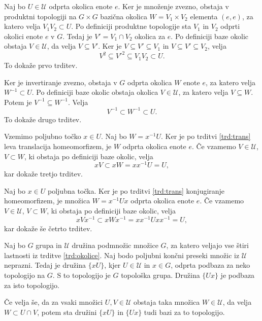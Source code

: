 \documentclass[mat1]{fmfdelo}
\newcommand{\Ucurl}{\mathcal{U}}
\begin{document}
\begin{dokaz}
Naj bo $U \in \Ucurl$  odprta okolica enote $e$. Ker je množenje zvezno, obstaja v produktni topologiji na $G \times G$ bazična okolica $W = V_1 \times V_2$ elementa $(e, e)$, za katero velja $V_1V_2 \subset U$. Po definiciji produktne topologije sta $V_1$ in $V_2$ odprti okolici enote $e$ v $G$. Tedaj je $V' = V_1 \cap V_2$ okolica za $e$. Po definiciji baze okolic obstaja $V \in \Ucurl$, da velja $V \subseteq V'$. Ker je $V \subseteq V' \subseteq V_1$ in $V \subseteq V' \subseteq V_2$, velja \[V^2 \subseteq V'^2 \subseteq V_1V_2 \subset U.\] To dokaže prvo trditev.

Ker je invertiranje zvezno, obstaja v $G$ odprta okolica $W$ enote $e$, za katero velja $W^{-1} \subset U$. Po definiciji baze okolic obstaja okolica $V \in \Ucurl$, za katero velja $V \subseteq W$. Potem je $V^{-1} \subseteq W^{-1}$. Velja \[V^{-1} \subset W^{-1} \subset U.\] To dokaže drugo trditev.

Vzemimo poljubno točko $x \in U$. Naj bo $W = x^{-1}U$. Ker je po trditvi \ref{trd:trans} leva translacija homeomorfizem, je $W$ odprta okolica enote $e$. Če vzamemo $V \in \Ucurl$, $V \subset W$, ki obstaja po definiciji baze okolic, velja \[xV \subset xW = xx^{-1}U = U,\]
kar dokaže tretjo trditev.

Naj bo $x \in U$ poljubna točka. Ker je po trditvi \ref{trd:trans} konjugiranje homeomorfizem, je množica $W = x^{-1}Ux$ odprta okolica enote $e$. Če vzamemo $V \in \Ucurl$, $V \subset W$, ki obstaja po definiciji baze okolic, velja
\[ xVx^{-1} \subset xWx^{-1} = xx^{-1}Uxx^{-1} = U, \]
kar dokaže še četrto trditev.
\end{dokaz}

\begin{izrek}\label{izr:bazaokolice}
Naj bo $G$ grupa in $\Ucurl$ družina podmnožic množice $G$, za katero veljajo vse štiri lastnosti iz trditve \ref{trd:okolice}. Naj bodo poljubni končni preseki množic iz $\Ucurl$ neprazni. Tedaj je družina $\lbrace xU \rbrace$, kjer $U \in \Ucurl$ in $x \in G$, odprta podbaza za neko topologijo na $G$. S to topologijo je $G$ topološka grupa. Družina $\lbrace Ux \rbrace$ je podbaza za isto topologijo.

Če velja še, da za vsaki množici $U,V \in \Ucurl$ obstaja taka množica $W \in \Ucurl$, da velja $W \subset U \cap V$, potem sta družini $\lbrace xU \rbrace$ in $\lbrace Ux \rbrace$ tudi bazi za to topologijo.
\end{izrek}
\end{document}
